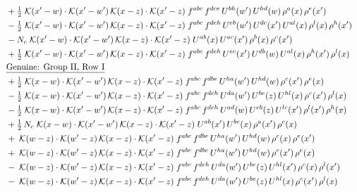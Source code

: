 \documentclass[10pt]{article}
\numberwithin{equation}{section}
\begin{document}
\begin{align}
&\quad +\tfrac{1}{2}\;\mathcal{K}(x'-w)\cdot\mathcal{K}(x'-w')\,\mathcal{K}(x-z)\cdot\mathcal{K}(x'-z)\;f^{abc}\,f^{dce}\,U^{bh}(w')\,U^{hd}(w)\,\rho^{a}(x)\,\rho^{e}(x')\notag\\
&\quad -\tfrac{1}{2}\;\mathcal{K}(x'-w)\cdot\mathcal{K}(x'-w')\,\mathcal{K}(x-z)\cdot\mathcal{K}(x'-z)\;f^{abc}\,f^{deh}\,U^{eb}(w')\,U^{dc}(x')\,U^{al}(x)\,\rho^{l}(x)\,\rho^{h}(x')\notag\\
&\quad -N_c\;\mathcal{K}(x'-w)\cdot\mathcal{K}(x'-w')\,\mathcal{K}(x-z)\cdot\mathcal{K}(x'-z)\;U^{ab}(x)\,U^{ac}(x')\,\rho^{b}(x)\,\rho^{c}(x')\notag\\
&\quad +\tfrac{1}{2}\;\mathcal{K}(x'-w)\cdot\mathcal{K}(x'-w')\,\mathcal{K}(x-z)\cdot\mathcal{K}(x'-z)\;f^{abc}\,f^{deh}\,U^{ec}(x')\,U^{db}(w)\,U^{al}(x)\,\rho^{h}(x')\,\rho^{l}(x)\notag\\
&\quad\underline{\text{Genuine: Group II, Row I}}\notag\\
&\quad +\tfrac{1}{2}\;\mathcal{K}(x-w)\cdot\mathcal{K}(x'-w')\,\mathcal{K}(x-z)\cdot\mathcal{K}(x'-z)\;f^{abc}\,f^{dbe}\,U^{ha}(w')\,U^{hd}(w)\,\rho^{c}(x')\,\rho^{e}(x)\notag\\
&\quad -\tfrac{1}{2}\;\mathcal{K}(x-w)\cdot\mathcal{K}(x'-w')\,\mathcal{K}(x-z)\cdot\mathcal{K}(x'-z)\;f^{abc}\,f^{deh}\,U^{da}(w')\,U^{be}(z)\,U^{hl}(x)\,\rho^{c}(x')\,\rho^{l}(x)\notag\\
&\quad -\tfrac{1}{2}\;\mathcal{K}(x-w)\cdot\mathcal{K}(x'-w')\,\mathcal{K}(x-z)\cdot\mathcal{K}(x'-z)\;f^{abc}\,f^{deh}\,U^{ad}(w)\,U^{eb}(z)\,U^{lc}(x')\,\rho^{l}(x')\,\rho^{h}(x)\notag\\
&\quad +\tfrac{1}{2}\,N_c\;\mathcal{K}(x-w)\cdot\mathcal{K}(x'-w')\,\mathcal{K}(x-z)\cdot\mathcal{K}(x'-z)\;U^{ab}(x')\,U^{bc}(x)\,\rho^{a}(x')\,\rho^{c}(x)\notag\\
&\quad +\;\mathcal{K}(w-z)\cdot\mathcal{K}(w'-z)\,\mathcal{K}(x-z)\cdot\mathcal{K}(x'-z)\;f^{abc}\,f^{dbe}\,U^{ha}(w')\,U^{hd}(w)\,\rho^{c}(x)\,\rho^{e}(x')\notag\\
&\quad +\;\mathcal{K}(w-z)\cdot\mathcal{K}(w'-z)\,\mathcal{K}(x-z)\cdot\mathcal{K}(x'-z)\;f^{abc}\,f^{dbe}\,U^{ha}(w')\,U^{hd}(w)\,\rho^{c}(x')\,\rho^{e}(x)\notag\\
&\quad -\;\mathcal{K}(w-z)\cdot\mathcal{K}(w'-z)\,\mathcal{K}(x-z)\cdot\mathcal{K}(x'-z)\;f^{abc}\,f^{deh}\,U^{da}(w')\,U^{be}(z)\,U^{hl}(x')\,\rho^{c}(x)\,\rho^{l}(x')\notag\\
&\quad -\;\mathcal{K}(w-z)\cdot\mathcal{K}(w'-z)\,\mathcal{K}(x-z)\cdot\mathcal{K}(x'-z)\;f^{abc}\,f^{deh}\,U^{da}(w')\,U^{be}(z)\,U^{hl}(x)\,\rho^{c}(x')\,\rho^{l}(x)\notag\\

\end{align}
\end{document}

